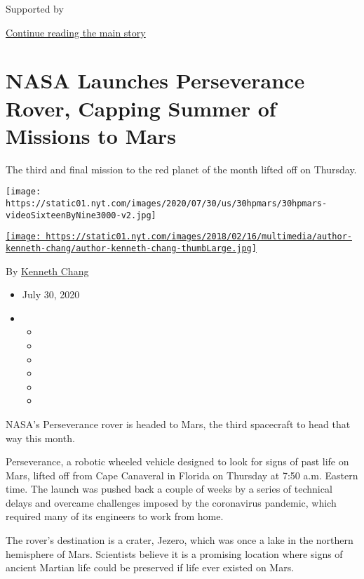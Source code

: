 Supported by

\protect\hyperlink{after-sponsor}{Continue reading the main story}

\hypertarget{nasa-launches-perseverance-rover-capping-summer-of-missions-to-mars}{%
\section{NASA Launches Perseverance Rover, Capping Summer of Missions to
Mars}\label{nasa-launches-perseverance-rover-capping-summer-of-missions-to-mars}}

The third and final mission to the red planet of the month lifted off on
Thursday.

\texttt{[image: https://static01.nyt.com/images/2020/07/30/us/30hpmars/30hpmars-videoSixteenByNine3000-v2.jpg]}

\href{https://www.nytimes.com/by/kenneth-chang}{\texttt{[image: https://static01.nyt.com/images/2018/02/16/multimedia/author-kenneth-chang/author-kenneth-chang-thumbLarge.jpg]}}

By \href{https://www.nytimes.com/by/kenneth-chang}{Kenneth Chang}

\begin{itemize}
\item
  July 30, 2020
\item
  \begin{itemize}
  \item
  \item
  \item
  \item
  \item
  \item
  \end{itemize}
\end{itemize}

NASA's Perseverance rover is headed to Mars, the third spacecraft to
head that way this month.

Perseverance, a robotic wheeled vehicle designed to look for signs of
past life on Mars, lifted off from Cape Canaveral in Florida on Thursday
at 7:50 a.m. Eastern time. The launch was pushed back a couple of weeks
by a series of technical delays and overcame challenges imposed by the
coronavirus pandemic, which required many of its engineers to work from
home.

The rover's destination is a crater, Jezero, which was once a lake in
the northern hemisphere of Mars. Scientists believe it is a promising
location where signs of ancient Martian life could be preserved if life
ever existed on Mars.

